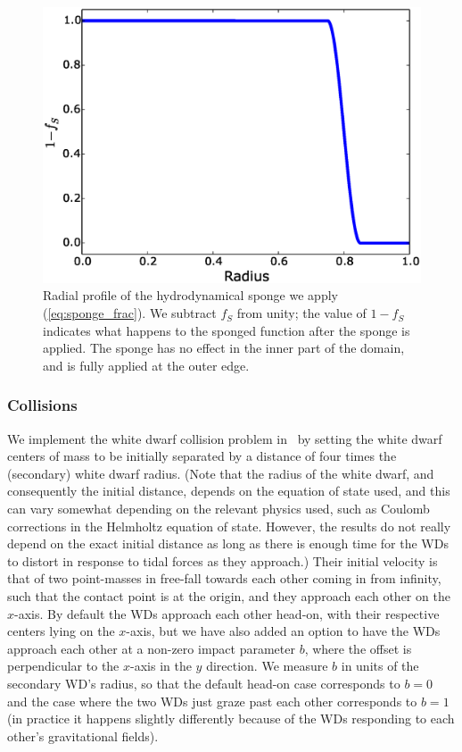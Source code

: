 \documentclass[12pt]{article}
\begin{document}
\begin{figure}
  \centering
  \includegraphics[scale=0.8]{plots/sponge}
  \caption[Radial profile of the hydrodynamical sponge]
          {Radial profile of the hydrodynamical sponge we apply (\autoref{eq:sponge_frac}). 
           We subtract $f_S$ from unity; the value of $1 - f_S$ indicates what happens 
           to the sponged function after the sponge is applied. The sponge has no effect 
           in the inner part of the domain, and is fully applied at the outer edge.
           \label{fig:sponge}
          }
\end{figure}


\clearpage
\subsubsection{Collisions}
\label{sec:initial_state:collisions}

We implement the white dwarf collision problem in \castro\ by setting the white dwarf
centers of mass to be initially separated by a distance of four times
the (secondary) white dwarf radius. (Note that the radius of the white dwarf, and
consequently the initial distance, depends on the equation of state used, and this
can vary somewhat depending on the relevant physics used, such as Coulomb corrections
in the Helmholtz equation of state. However, the results do not really depend on the
exact initial distance as long as there is enough time for the WDs to distort in
response to tidal forces as they approach.) Their initial velocity is that of
two point-masses in free-fall towards each other coming in from infinity, such that
the contact point is at the origin, and they approach each other on the $x$-axis.
By default the WDs approach each other head-on, with their respective centers
lying on the $x$-axis, but we have also added an option
to have the WDs approach each other at a non-zero impact parameter $b$, where the
offset is perpendicular to the $x$-axis in the $y$ direction. We measure
$b$ in units of the secondary WD's radius, so that the default head-on case
corresponds to $b = 0$ and the case where the two WDs just graze past each other
corresponds to $b = 1$ (in practice it happens slightly differently because
of the WDs responding to each other's gravitational fields).
\end{document}
